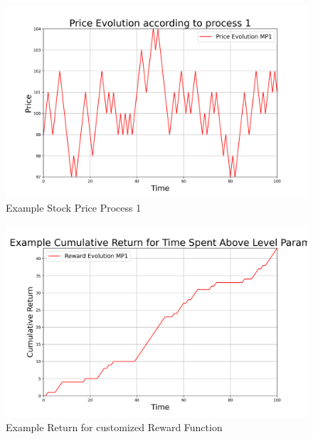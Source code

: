 \documentclass{article}[12pt]
\begin{document}
\begin{figure}
  \includegraphics[width=\linewidth]{ex_price.png}
  \caption{Example Stock Price Process 1}
  \label{fig:rollDist}
\end{figure}

\begin{figure}
  \includegraphics[width=\linewidth]{ex_rew.png}
  \caption{Example Return for customized Reward Function}
  \label{fig:term_out}
\end{figure}
\end{document}
